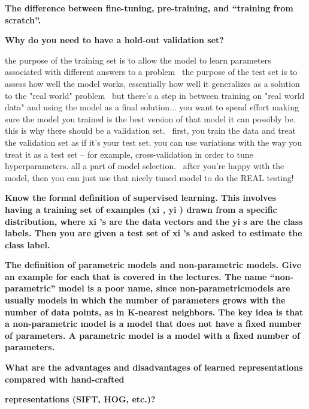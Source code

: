 \documentclass[10pt,letterpaper]{article}
\begin{document}
\subitem \textbf{ The difference between fine-tuning, pre-training, and “training from scratch”.}
\begin{solution}

\end{solution}
\subitem \textbf{ Why do you need to have a hold-out validation set?}
\begin{solution}
the purpose of the training set is to allow the model to learn parameters associated with different answers to a problem \
the purpose of the test set is to assess how well the model works, essentially how well it generalizes as a solution to the "real world" problem \
but there's a step in between training on "real world data" and using the model as a final solution... you want to spend effort making sure the model you trained is the best version of that model it can possibly be. this is why there should be a validation set. \
first, you train the data and treat the validation set as if it's your test set. you can use variations with the way you treat it as a test set -- for example, cross-validation in order to tune hyperparameters. all a part of model selection. \
after you're happy with the model, then you can just use that nicely tuned model to do the REAL testing!
\end{solution}
\subitem \textbf{ Know the formal definition of supervised learning. This involves having a training set of examples (xi , yi ) drawn from a specific distribution, where xi ’s are the data vectors and the yi s are the class labels. Then you are given a test set of xi ’s and asked to estimate the class label.}
\begin{solution}
\end{solution}
\subitem \textbf{ The definition of parametric models and non-parametric models. Give an example for each that is covered in the lectures. The name “non-parametric” model is a poor name, since non-parametricmodels are usually models in which the number of parameters grows with the number of data points, as in K-nearest neighbors. The key idea is that a non-parametric model is a model that does not have a fixed number of parameters. A parametric model is a model with a fixed number of parameters. }
\begin{solution}
\end{solution}
\subitem \textbf{ What are the advantages and disadvantages of learned representations compared with hand-crafted}
\begin{solution}
\end{solution}
\subitem \textbf{ representations (SIFT, HOG, etc.)?}
\end{document}
